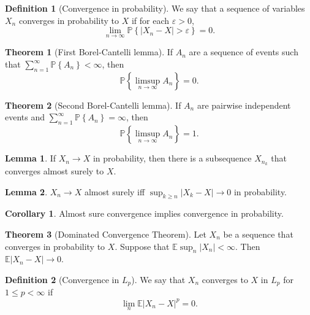 \documentclass{article}
\theoremstyle{definition}
\newtheorem{theorem}{Theorem}[section]
\newtheorem{definition}{Definition}[section]
\newtheorem{lemma}{Lemma}[section]
\newtheorem{corollary}{Corollary}[section]
\begin{document}
  \begin{definition}[Convergence in probability]
    We say that a sequence of variables \( X_n \) converges in
    probability to \( X \) if for each \( \varepsilon > 0 \),
    \[
      \lim_{n \rightarrow \infty} \mathbb{P}\left\{ \left| X_n - X
      \right| > \varepsilon \right\} = 0.
    \]
  \end{definition}

  \begin{theorem}[First Borel-Cantelli lemma]
    If \( A_{n} \) are a sequence of events such that \(
    \sum_{n=1}^{\infty} \mathbb{P}\left\{ A_{n} \right\} < \infty \), then
    \[
      \mathbb{P}\left\{ \limsup_{n \rightarrow \infty} A_{n} \right\} = 0.
    \]
  \end{theorem}

  \begin{theorem}[Second Borel-Cantelli lemma]
    If \( A_{n} \) are pairwise independent events and \( \sum_{n=1}^{\infty}
    \mathbb{P}\left\{ A_{n} \right\} = \infty \), then
    \[
      \mathbb{P}\left\{ \limsup_{n \rightarrow \infty} A_{n} \right\} = 1.
    \]
  \end{theorem}

  \begin{lemma}
    If \( X_n \rightarrow X \) in probability, then there is a
    subsequence \( X_{n_{k}} \) that converges almost surely to \( X \).
  \end{lemma}

  \begin{lemma}
    \( X_{n} \rightarrow X \) almost surely iff \( \sup_{k
    \geq n} \left| X_{k} - X \right| \rightarrow 0 \) in probability.
  \end{lemma}

  \begin{corollary}
    Almost sure convergence implies convergence in probability.
  \end{corollary}

  \begin{theorem}[Dominated Convergence Theorem]
    Let \( X_n \) be a sequence that converges in probability to \( X
    \). Suppose that \( \mathbb{E} \sup_{n} \left| X_{n} \right| <
    \infty \). Then \( \mathbb{E} \left| X_{n} - X \right| \rightarrow 0\).
  \end{theorem}

  \begin{definition}[Convergence in \( L_{p} \)]
    We say that \( X_{n} \) converges to \( X \) in \( L_{p} \) for \(
    1 \leq p < \infty \) if
    \[
      \lim_{n} \mathbb{E} \left| X_{n} - X \right|^{p} = 0.
    \]
  \end{definition}
\end{document}
